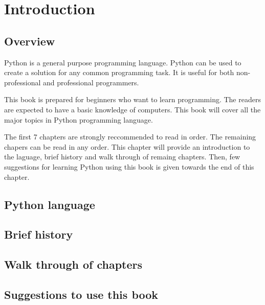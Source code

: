 \cleardoublepage
{}
\chapter{Introduction}

\section{Overview}

Python is a general purpose programming language.  Python can be used
to create a solution for any common programming task.  It is useful
for both non-professional and professional programmers.

This book is prepared for beginners who want to learn programming.
The readers are expected to have a basic knowledge of computers.  This
book will cover all the major topics in Python programming language.

The first 7 chapters are strongly reccommended to read in order.  The
remaining chapers can be read in any order.  This chapter will provide
an introduction to the laguage, brief history and walk through of
remaing chapters.  Then, few suggestions for learning Python using
this book is given towards the end of this chapter.

\newpage
\section{Python language}

\newpage
\section{Brief history}

\newpage
\section{Walk through of chapters}

\newpage
\section{Suggestions to use this book}

